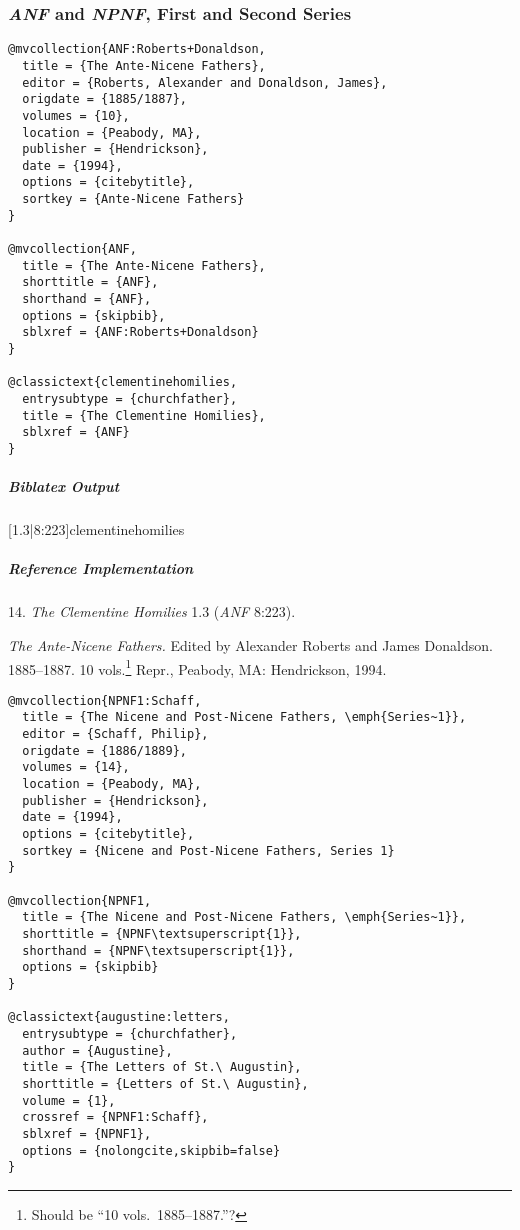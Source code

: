 \documentclass[a4paper]{article}
\newenvironment{biboutput}{%
  \subparagraph{Biblatex Output}
}{\color{black}}
\newenvironment{refimp}{%
  \subparagraph{Reference Implementation}
  \color{reference-colour}
  \rm
}{\par\color{black}}
\begin{document}
\subsubsection{\emph{ANF} and \emph{NPNF}, First and Second Series}

\begin{lstlisting}
@mvcollection{ANF:Roberts+Donaldson,
  title = {The Ante-Nicene Fathers},
  editor = {Roberts, Alexander and Donaldson, James},
  origdate = {1885/1887},
  volumes = {10},
  location = {Peabody, MA},
  publisher = {Hendrickson},
  date = {1994},
  options = {citebytitle},
  sortkey = {Ante-Nicene Fathers}
}

@mvcollection{ANF,
  title = {The Ante-Nicene Fathers},
  shorttitle = {ANF},
  shorthand = {ANF},
  options = {skipbib},
  sblxref = {ANF:Roberts+Donaldson}
} 

@classictext{clementinehomilies,
  entrysubtype = {churchfather},
  title = {The Clementine Homilies},
  sblxref = {ANF}
}
\end{lstlisting}

\begin{biboutput}
  [1.3|8:223]{clementinehomilies}
\end{biboutput}

\begin{refimp}
  14. \emph{The Clementine Homilies} 1.3 (\emph{ANF} 8:223).

  \hangindent\bibindent \emph{The Ante-Nicene Fathers.} Edited by Alexander
  Roberts and James Donaldson. 1885–1887. 10 vols.\footnote{Should be “10
  vols.\ 1885–1887.”?} Repr., Peabody, MA:
  Hendrickson, 1994.

\end{refimp}

\medskip

\begin{lstlisting}
@mvcollection{NPNF1:Schaff,
  title = {The Nicene and Post-Nicene Fathers, \emph{Series~1}},
  editor = {Schaff, Philip},
  origdate = {1886/1889},
  volumes = {14},
  location = {Peabody, MA},
  publisher = {Hendrickson},
  date = {1994},
  options = {citebytitle},
  sortkey = {Nicene and Post-Nicene Fathers, Series 1}
}

@mvcollection{NPNF1,
  title = {The Nicene and Post-Nicene Fathers, \emph{Series~1}},
  shorttitle = {NPNF\textsuperscript{1}},
  shorthand = {NPNF\textsuperscript{1}},
  options = {skipbib}
}

@classictext{augustine:letters,
  entrysubtype = {churchfather},
  author = {Augustine},
  title = {The Letters of St.\ Augustin},
  shorttitle = {Letters of St.\ Augustin},
  volume = {1},
  crossref = {NPNF1:Schaff},
  sblxref = {NPNF1},
  options = {nolongcite,skipbib=false}
}
\end{lstlisting}
\end{document}
